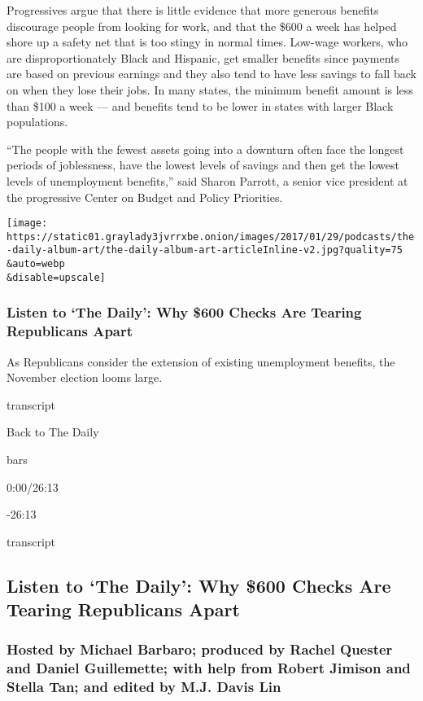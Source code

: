 Progressives argue that there is little evidence that more generous
benefits discourage people from looking for work, and that the \$600 a
week has helped shore up a safety net that is too stingy in normal
times. Low-wage workers, who are disproportionately Black and Hispanic,
get smaller benefits since payments are based on previous earnings and
they also tend to have less savings to fall back on when they lose their
jobs. In many states, the minimum benefit amount is less than \$100 a
week --- and benefits tend to be lower in states with larger Black
populations.

``The people with the fewest assets going into a downturn often face the
longest periods of joblessness, have the lowest levels of savings and
then get the lowest levels of unemployment benefits,'' said Sharon
Parrott, a senior vice president at the progressive Center on Budget and
Policy Priorities.

\texttt{[image: https://static01.graylady3jvrrxbe.onion/images/2017/01/29/podcasts/the-daily-album-art/the-daily-album-art-articleInline-v2.jpg?quality=75\\\&auto=webp\\\&disable=upscale]}

\hypertarget{listen-to-the-daily-why-600-checks-are-tearing-republicans-apart}{%
\subsubsection{Listen to `The Daily': Why \$600 Checks Are Tearing
Republicans
Apart}\label{listen-to-the-daily-why-600-checks-are-tearing-republicans-apart}}

As Republicans consider the extension of existing unemployment benefits,
the November election looms large.

transcript

Back to The Daily

bars

0:00/26:13

-26:13

transcript

\hypertarget{listen-to-the-daily-why-600-checks-are-tearing-republicans-apart-1}{%
\subsection{Listen to `The Daily': Why \$600 Checks Are Tearing
Republicans
Apart}\label{listen-to-the-daily-why-600-checks-are-tearing-republicans-apart-1}}

\hypertarget{hosted-by-michael-barbaro-produced-by-rachel-quester-and-daniel-guillemette-with-help-from-robert-jimison-and-stella-tan-and-edited-by-mj-davis-lin}{%
\subsubsection{Hosted by Michael Barbaro; produced by Rachel Quester and
Daniel Guillemette; with help from Robert Jimison and Stella Tan; and
edited by M.J. Davis
Lin}\label{hosted-by-michael-barbaro-produced-by-rachel-quester-and-daniel-guillemette-with-help-from-robert-jimison-and-stella-tan-and-edited-by-mj-davis-lin}}

